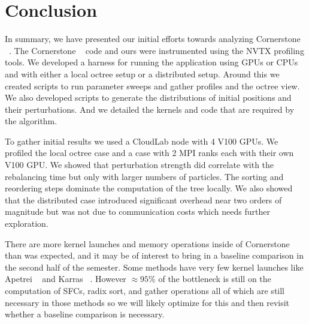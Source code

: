 \section{Conclusion}
\label{sec:conclusion}

In summary, we have presented our initial efforts towards analyzing Cornerstone ~\cite{cornerstone}. The Cornerstone ~\cite{cornerstone} code and ours were instrumented using the NVTX profiling tools. We developed a harness for running the application using GPUs or CPUs and with either a local octree setup or a distributed setup. Around this we created scripts to run parameter sweeps and gather profiles and the octree view. We also developed scripts to generate the distributions of initial positions and their perturbations. And we detailed the kernels and code that are required by the algorithm.

To gather initial results we used a CloudLab node with 4 V100 GPUs. We profiled the local octree case and a case with 2 MPI ranks each with their own V100 GPU. We showed that perturbation strength did correlate with the rebalancing time but only with larger numbers of particles. The sorting and reordering steps dominate the computation of the tree locally. We also showed that the distributed case introduced significant overhead near two orders of magnitude but was not due to communication costs which needs further exploration.

There are more kernel launches and memory operations inside of Cornerstone than was expected, and it may be of interest to bring in a baseline comparison in the second half of the semester. Some methods have very few kernel launches like Apetrei ~\cite{lbvh} and Karras ~\cite{karras}. However $\approx 95\%$ of the bottleneck is still on the computation of SFCs, radix sort, and gather operations all of which are still necessary in those methods so we will likely optimize for this and then revisit whether a baseline comparison is necessary.
